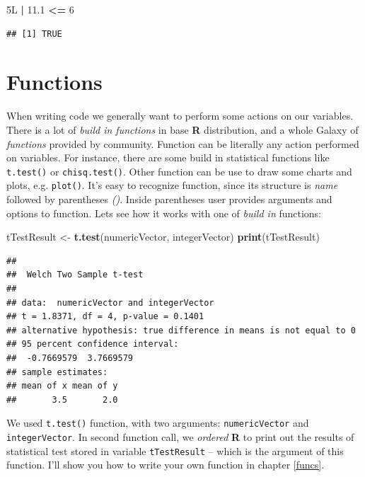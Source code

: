 \documentclass[]{book}
\newenvironment{Shaded}{\begin{snugshade}}{\end{snugshade}}
\newcommand{\KeywordTok}[1]{\textcolor[rgb]{0.13,0.29,0.53}{\textbf{#1}}}
\newcommand{\DecValTok}[1]{\textcolor[rgb]{0.00,0.00,0.81}{#1}}
\newcommand{\FloatTok}[1]{\textcolor[rgb]{0.00,0.00,0.81}{#1}}
\newcommand{\StringTok}[1]{\textcolor[rgb]{0.31,0.60,0.02}{#1}}
\newcommand{\OperatorTok}[1]{\textcolor[rgb]{0.81,0.36,0.00}{\textbf{#1}}}
\newcommand{\NormalTok}[1]{#1}
\theoremstyle{definition}
\theoremstyle{definition}
\theoremstyle{definition}
\theoremstyle{remark}
\begin{document}
\begin{Shaded}
\begin{Highlighting}[]
\NormalTok{5L }\OperatorTok{|}\StringTok{ }\FloatTok{11.1} \OperatorTok{<=}\StringTok{ }\DecValTok{6}
\end{Highlighting}
\end{Shaded}

\begin{verbatim}
## [1] TRUE
\end{verbatim}

\section{Functions}\label{functions}

When writing code we generally want to perform some actions on our
variables. There is a lot of \emph{build in functions} in base
\textbf{R} distribution, and a whole Galaxy of \emph{functions} provided
by community. Function can be literally any action performed on
variables. For instance, there are some build in statistical functions
like \texttt{t.test()} or \texttt{chisq.test()}. Other function can be
use to draw some charts and plots, e.g. \texttt{plot()}. It's easy to
recognize function, since its structure is \emph{name} followed by
parentheses \emph{()}. Inside parentheses user provides arguments and
options to function. Lets see how it works with one of \emph{build in}
functions:

\begin{Shaded}
\begin{Highlighting}[]
\NormalTok{tTestResult <-}\StringTok{ }\KeywordTok{t.test}\NormalTok{(numericVector, integerVector)}
\KeywordTok{print}\NormalTok{(tTestResult)}
\end{Highlighting}
\end{Shaded}

\begin{verbatim}
## 
##  Welch Two Sample t-test
## 
## data:  numericVector and integerVector
## t = 1.8371, df = 4, p-value = 0.1401
## alternative hypothesis: true difference in means is not equal to 0
## 95 percent confidence interval:
##  -0.7669579  3.7669579
## sample estimates:
## mean of x mean of y 
##       3.5       2.0
\end{verbatim}

We used \texttt{t.test()} function, with two arguments:
\texttt{numericVector} and \texttt{integerVector}. In second function
call, we \emph{ordered} \textbf{R} to print out the results of
statistical test stored in variable \texttt{tTestResult} -- which is the
argument of this function. I'll show you how to write your own function
in chapter \ref{funcs}.
\end{document}
